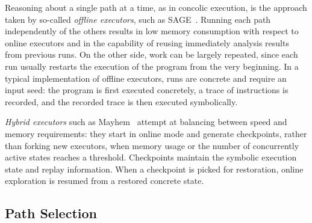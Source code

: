 Reasoning about a single path at a time, as in concolic execution, is the approach taken by so-called {\em offline executors}, such as {\sc SAGE}~\cite{SAGE-NDSS08}. Running each path independently of the others results in low memory consumption with respect to online executors and in the capability of reusing immediately analysis results from previous runs. On the other side, work can be largely repeated, since each run usually restarts the execution of the program from the very beginning. In a typical implementation of offline executors, runs are concrete and require an input seed: the program is first executed concretely, a trace of instructions is recorded, and the recorded trace is then executed symbolically.

{\em Hybrid executors} such as {\sc Mayhem}~\cite{MAYHEM-SP12} attempt at balancing between speed and memory requirements: they start in online mode and generate checkpoints, rather than forking new executors, when memory usage or the number of concurrently active states reaches a threshold. Checkpoints maintain the symbolic execution state and replay information. When a checkpoint is picked for restoration, online exploration is resumed from a restored concrete state.

\subsection{Path Selection}
\label{ss:heuristics}


